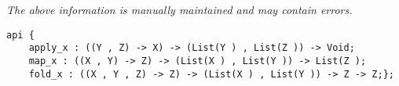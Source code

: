 \label{api:List\_Cross\_Product}

{\tiny \it The above information is manually maintained and may contain errors.}
\begin{verbatim}
api {
    apply_x : ((Y , Z) -> X) -> (List(Y ) , List(Z )) -> Void;
    map_x : ((X , Y) -> Z) -> (List(X ) , List(Y )) -> List(Z );
    fold_x : ((X , Y , Z) -> Z) -> (List(X ) , List(Y )) -> Z -> Z;};
\end{verbatim}
